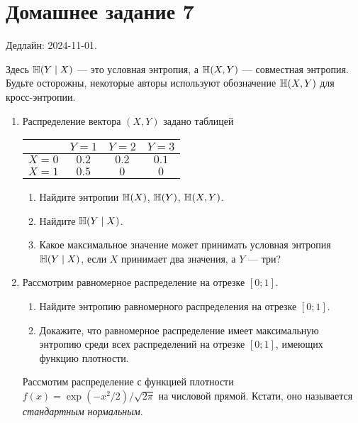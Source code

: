 \section*{Домашнее задание 7}


Дедлайн: 2024-11-01.

Здесь $\operatorname{\mathbb{H}}(Y \mid X)$ — это условная энтропия, а $\operatorname{\mathbb{H}}(X, Y)$ — совместная энтропия. 
Будьте осторожны, некоторые авторы используют обозначение $\operatorname{\mathbb{H}}(X, Y)$ для кросс-энтропии. 


\begin{enumerate}
\item Распределение вектора $(X, Y)$ задано таблицей

\begin{center}
    \begin{tabular}{lccc}
    	\toprule
    	    & $Y = 1$  & $Y = 2$  & $Y = 3$ \\
        \midrule
    	$X = 0$ & $0.2$  & $0.2$  & $0.1$ \\
        $X = 1$ & $0.5$  &  $0$   & $0$ \\
      \bottomrule
    \end{tabular}
\end{center}

\begin{enumerate}
    \item Найдите энтропии $\operatorname{\mathbb{H}}(X)$, $\operatorname{\mathbb{H}}(Y)$, $\operatorname{\mathbb{H}}(X, Y)$.
    \item Найдите $\operatorname{\mathbb{H}}(Y \mid X)$.
    \item Какое максимальное значение может принимать условная энтропия $\operatorname{\mathbb{H}}(Y \mid X)$, 
    если $X$ принимает два значения, а $Y$ — три?
\end{enumerate}

\item Рассмотрим равномерное распределение на отрезке $[0; 1]$.

\begin{enumerate}
    \item Найдите энтропию равномерного распределения на отрезке $[0; 1]$.
    \item Докажите, что равномерное распределение имеет максимальную энтропию среди всех распределений на отрезке $[0; 1]$,
    имеющих функцию плотности. 
\end{enumerate}

Рассмотим распределение с функцией плотности $f(x) = \exp(-x^2/2)/\sqrt{2\pi}$ на числовой прямой. 
Кстати, оно называется \emph{стандартным нормальным}. 


\end{enumerate}
